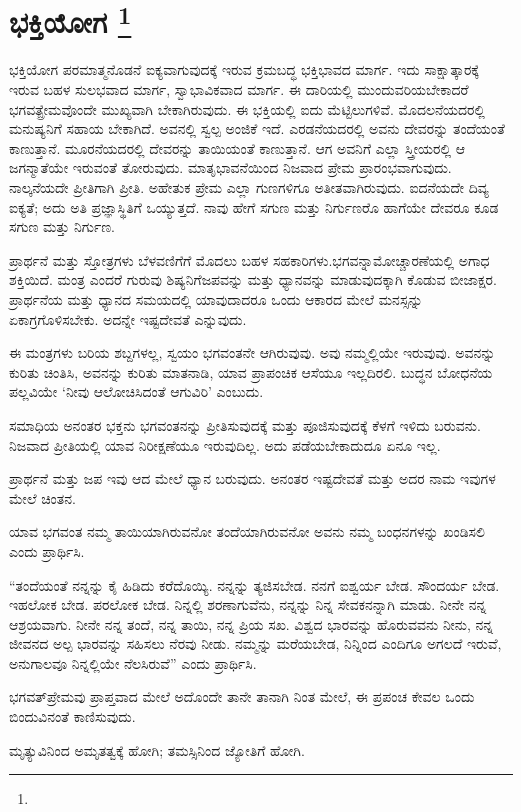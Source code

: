 
\chapter[ಭಕ್ತಿಯೋಗ ]{ಭಕ್ತಿಯೋಗ \protect\footnote{}}

ಭಕ್ತಿಯೋಗ ಪರಮಾತ್ಮನೊಡನೆ ಐಕ್ಯವಾಗುವುದಕ್ಕೆ ಇರುವ ಕ್ರಮಬದ್ಧ ಭಕ್ತಿಭಾವದ ಮಾರ್ಗ. ಇದು ಸಾಕ್ಷಾತ್ಕಾರಕ್ಕೆ ಇರುವ ಬಹಳ ಸುಲಭವಾದ ಮಾರ್ಗ, ಸ್ವಾಭಾವಿಕವಾದ ಮಾರ್ಗ. ಈ ದಾರಿಯಲ್ಲಿ ಮುಂದುವರಿಯಬೇಕಾದರೆ ಭಗವತ್ಪ್ರೇಮವೊಂದೇ ಮುಖ್ಯವಾಗಿ ಬೇಕಾಗಿರುವುದು. ಈ ಭಕ್ತಿಯಲ್ಲಿ ಐದು ಮೆಟ್ಟಿಲುಗಳಿವೆ. ಮೊದಲನೆಯದರಲ್ಲಿ ಮನುಷ್ಯನಿಗೆ ಸಹಾಯ ಬೇಕಾಗಿದೆ. ಅವನಲ್ಲಿ ಸ್ವಲ್ಪ ಅಂಜಿಕೆ ಇದೆ. ಎರಡನೆಯದರಲ್ಲಿ ಅವನು ದೇವರನ್ನು ತಂದೆಯಂತೆ ಕಾಣುತ್ತಾನೆ. ಮೂರನೆಯದರಲ್ಲಿ ದೇವರನ್ನು ತಾಯಿಯಂತೆ ಕಾಣುತ್ತಾನೆ. ಆಗ ಅವನಿಗೆ ಎಲ್ಲಾ ಸ್ತ್ರೀಯರಲ್ಲಿ ಆ ಜಗನ್ಮಾತೆಯೇ ಇರುವಂತೆ ತೋರುವುದು. ಮಾತೃಭಾವನೆಯಿಂದ ನಿಜವಾದ ಪ್ರೇಮ ಪ್ರಾರಂಭವಾಗುವುದು. ನಾಲ್ಕನೆಯದೇ ಪ್ರೀತಿಗಾಗಿ ಪ್ರೀತಿ. ಅಹೇತುಕ ಪ್ರೇಮ ಎಲ್ಲಾ ಗುಣಗಳಿಗೂ ಅತೀತವಾಗಿರುವುದು. ಐದನೆಯದೇ ದಿವ್ಯ ಐಕ್ಯತೆ; ಅದು ಅತಿ ಪ್ರಜ್ಞಾಸ್ಥಿತಿಗೆ ಒಯ್ಯುತ್ತದೆ. ನಾವು ಹೇಗೆ ಸಗುಣ ಮತ್ತು ನಿರ್ಗುಣರೊ ಹಾಗೆಯೇ ದೇವರೂ ಕೂಡ ಸಗುಣ ಮತ್ತು ನಿರ್ಗುಣ.

ಪ್ರಾರ್ಥನೆ ಮತ್ತು ಸ್ತೋತ್ರಗಳು ಬೆಳವಣಿಗೆಗೆ ಮೊದಲು ಬಹಳ ಸಹಕಾರಿಗಳು.\break ಭಗವನ್ನಾಮೋಚ್ಚಾರಣೆಯಲ್ಲಿ ಅಗಾಧ ಶಕ್ತಿಯಿದೆ. ಮಂತ್ರ ಎಂದರೆ ಗುರುವು ಶಿಷ್ಯನಿಗೆ\break ಜಪವನ್ನು ಮತ್ತು ಧ್ಯಾನವನ್ನು ಮಾಡುವುದಕ್ಕಾಗಿ ಕೊಡುವ ಬೀಜಾಕ್ಷರ. ಪ್ರಾರ್ಥನೆಯ ಮತ್ತು ಧ್ಯಾನದ ಸಮಯದಲ್ಲಿ ಯಾವುದಾದರೂ ಒಂದು ಆಕಾರದ ಮೇಲೆ ಮನಸ್ಸನ್ನು ಏಕಾಗ್ರಗೊಳಿಸಬೇಕು. ಅದನ್ನೇ ಇಷ್ಟದೇವತೆ ಎನ್ನುವುದು.

ಈ ಮಂತ್ರಗಳು ಬರಿಯ ಶಬ್ದಗಳಲ್ಲ, ಸ್ವಯಂ ಭಗವಂತನೇ ಆಗಿರುವುವು. ಅವು ನಮ್ಮಲ್ಲಿಯೇ ಇರುವುವು. ಅವನನ್ನು ಕುರಿತು ಚಿಂತಿಸಿ, ಅವನನ್ನು ಕುರಿತು ಮಾತನಾಡಿ, ಯಾವ ಪ್ರಾಪಂಚಿಕ ಆಸೆಯೂ ಇಲ್ಲದಿರಲಿ. ಬುದ್ಧನ ಬೋಧನೆಯ ಪಲ್ಲವಿಯೇ ‘ನೀವು ಆಲೋಚಿಸಿದಂತೆ ಆಗುವಿರಿ’ ಎಂಬುದು.

ಸಮಾಧಿಯ ಅನಂತರ ಭಕ್ತನು ಭಗವಂತನನ್ನು ಪ್ರೀತಿಸುವುದಕ್ಕೆ ಮತ್ತು ಪೂಜಿಸುವುದಕ್ಕೆ ಕೆಳಗೆ ಇಳಿದು ಬರುವನು. ನಿಜವಾದ ಪ್ರೀತಿಯಲ್ಲಿ ಯಾವ ನಿರೀಕ್ಷಣೆಯೂ ಇರುವುದಿಲ್ಲ. ಅದು ಪಡೆಯಬೇಕಾದುದೂ ಏನೂ ಇಲ್ಲ.

ಪ್ರಾರ್ಥನೆ ಮತ್ತು ಜಪ ಇವು ಆದ ಮೇಲೆ ಧ್ಯಾನ ಬರುವುದು. ಅನಂತರ ಇಷ್ಟದೇವತೆ ಮತ್ತು ಅದರ ನಾಮ ಇವುಗಳ ಮೇಲೆ ಚಿಂತನ.

ಯಾವ ಭಗವಂತ ನಮ್ಮ ತಾಯಿಯಾಗಿರುವನೋ ತಂದೆಯಾಗಿರುವನೋ ಅವನು ನಮ್ಮ ಬಂಧನಗಳನ್ನು ಖಂಡಿಸಲಿ ಎಂದು ಪ್ರಾರ್ಥಿಸಿ.

“ತಂದೆಯಂತೆ ನನ್ನನ್ನು ಕೈ ಹಿಡಿದು ಕರೆದೊಯ್ಯಿ. ನನ್ನನ್ನು ತ್ಯಜಿಸಬೇಡ. ನನಗೆ ಐಶ್ವರ್ಯ ಬೇಡ. ಸೌಂದರ್ಯ ಬೇಡ. ಇಹಲೋಕ ಬೇಡ. ಪರಲೋಕ ಬೇಡ. ನಿನ್ನಲ್ಲಿ ಶರಣಾಗುವೆನು, ನನ್ನನ್ನು ನಿನ್ನ ಸೇವಕನನ್ನಾಗಿ ಮಾಡು. ನೀನೇ ನನ್ನ ಆಶ್ರಯವಾಗು. ನೀನೇ ನನ್ನ ತಂದೆ, ನನ್ನ ತಾಯಿ, ನನ್ನ ಪ್ರಿಯ ಸಖ. ವಿಶ್ವದ ಭಾರವನ್ನು ಹೊರುವವನು ನೀನು, ನನ್ನ ಜೀವನದ ಅಲ್ಪ ಭಾರವನ್ನು ಸಹಿಸಲು ನೆರವು ನೀಡು. ನಮ್ಮನ್ನು ಮರೆಯಬೇಡ, ನಿನ್ನಿಂದ ಎಂದಿಗೂ ಅಗಲದೆ ಇರುವೆ, ಅನುಗಾಲವೂ ನಿನ್ನಲ್ಲಿಯೇ ನೆಲಸಿರುವೆ” ಎಂದು ಪ್ರಾರ್ಥಿಸಿ.

ಭಗವತ್​ಪ್ರೇಮವು ಪ್ರಾಪ್ತವಾದ ಮೇಲೆ ಅದೊಂದೇ ತಾನೇ ತಾನಾಗಿ ನಿಂತ ಮೇಲೆ, ಈ ಪ್ರಪಂಚ ಕೇವಲ ಒಂದು ಬಿಂದುವಿನಂತೆ ಕಾಣಿಸುವುದು.

ಮೃತ್ಯುವಿನಿಂದ ಅಮೃತತ್ವಕ್ಕೆ ಹೋಗಿ; ತಮಸ್ಸಿನಿಂದ ಜ್ಯೋತಿಗೆ ಹೋಗಿ.

